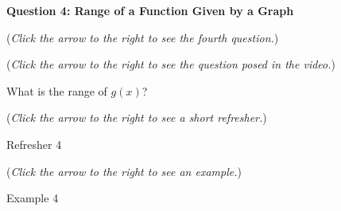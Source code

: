 \documentclass{ximera}
\begin{document}
\textbf{Question 4: Range of a Function Given by a Graph}
\begin{question}
\begin{flushright}
{\color{blue}(\emph{Click the arrow to the right to see the fourth question.})}
\end{flushright}
\begin{center}
\begin{expandable}
{\color{blue}(\emph{Click the arrow to the right to see the question
posed in the video.})}
\begin{expandable}
What is the range of $g(x)$?
\begin{multipleChoice}
\choice{$[-1,1)\cup(1,3]\cup[4,6]$}
\choice{$[-1,3]\cup[4,6]$}
\choice[correct]{$\{2\} \cup [6,15)$}
\choice{$\{2\}\cup [9,15)$}
\choice{$\{2\} \cup [6,9)$}
\end{multipleChoice}
\begin{flushright}
{\color{blue}(\emph{Click the arrow to the right to see a short refresher.})}
\end{flushright}
\begin{expandable}
Refresher 4
\end{expandable}
\begin{flushright}
{\color{blue}(\emph{Click the arrow to the right to see an example.})}
\end{flushright}
\begin{expandable}
Example 4
\end{expandable}
\end{expandable}
\end{expandable}
\end{center}
\end{question}
\end{document}
